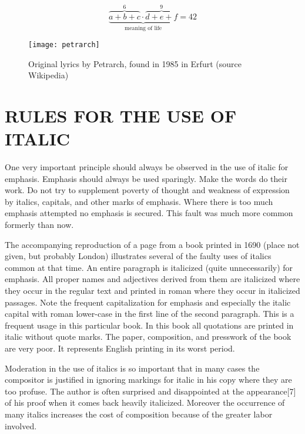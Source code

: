 \[\underbrace{\overbrace{a+b+c}^6
\cdot \overbrace{d+e+f}^9}
_\text{meaning of life} = 42\]

\begin{figure}
\texttt{[image: petrarch]}
\caption{Original lyrics by Petrarch, found in 1985 in Erfurt (source Wikipedia)}
\end{figure}

\chapter{RULES FOR THE USE OF ITALIC}

One very important principle should always be observed in the use of italic for emphasis. Emphasis should always be used sparingly. Make the words do their work. Do not try to supplement poverty of thought and weakness of expression by italics, capitals, and other marks of emphasis. Where there is too much emphasis attempted no emphasis is secured. This fault was much more common formerly than now.

The accompanying reproduction of a page from a book printed in 1690 (place not given, but probably London) illustrates several of the faulty uses of italics common at that time. An entire paragraph is italicized (quite unnecessarily) for emphasis. All proper names and adjectives derived from them are italicized where they occur in the regular text and printed in roman where they occur in italicized passages. Note the frequent capitalization for emphasis and especially the italic capital with roman lower-case in the first line of the second paragraph. This is a frequent usage in this particular book. In this book all quotations are printed in italic without quote marks. The paper, composition, and presswork of the book are very poor. It represents English printing in its worst period.

Moderation in the use of italics is so important that in many cases the compositor is justified in ignoring markings for italic in his copy where they are too profuse. The author is often surprised and disappointed at the appearance[7] of his proof when it comes back heavily italicized. Moreover the occurrence of many italics increases the cost of composition because of the greater labor involved.

